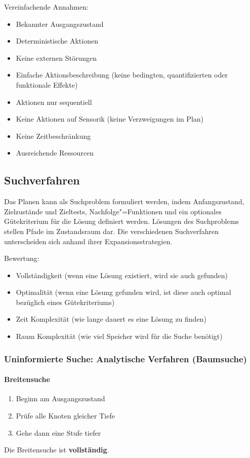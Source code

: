 Vereinfachende Annahmen:
\begin{itemize}
	\item Bekannter Ausgangszustand
	\item Deterministische Aktionen
	\item Keine externen Störungen
	\item Einfache Aktionsbeschreibung (keine bedingten, quantifizierten oder funktionale Effekte)
	\item Aktionen nur sequentiell
	\item Keine Aktionen auf Sensorik (keine Verzweigungen im Plan)
	\item Keine Zeitbeschränkung
	\item Ausreichende Ressourcen
\end{itemize}

\subsection{Suchverfahren}
Das Planen kann als Suchproblem formuliert werden, indem Anfangszustand, Zielzustände und Zieltests, Nachfolge"=Funktionen und ein optionales Gütekriterium für die Lösung definiert werden.
Lösungen des Suchproblems stellen Pfade im Zustandsraum dar.
Die verschiedenen Suchverfahren unterscheiden sich anhand ihrer Expansionsstrategien.

Bewertung:
\begin{itemize}
	\item Vollständigkeit (wenn eine Lösung existiert, wird sie auch gefunden)
	\item Optimalität (wenn eine Lösung gefunden wird, ist diese auch optimal bezüglich eines Gütekriteriums)
	\item Zeit Komplexität (wie lange dauert es eine Lösung zu finden)
	\item Raum Komplexität (wie viel Speicher wird für die Suche benötigt)
\end{itemize}

\subsubsection{Uninformierte Suche: Analytische Verfahren (Baumsuche)}
\paragraph*{Breitensuche}
\begin{enumerate}
	\item Beginn am Ausgangszustand
	\item Prüfe alle Knoten gleicher Tiefe
	\item Gehe dann eine Stufe tiefer
\end{enumerate}
Die Breitensuche ist \textbf{vollständig}.

